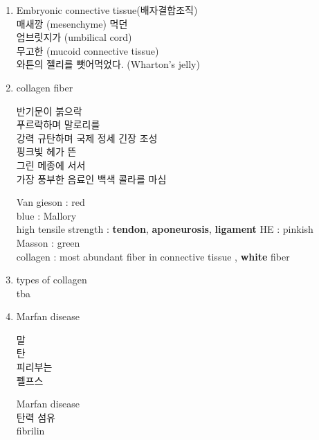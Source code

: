 \documentclass[10pt]{amsart}
\numberwithin{theorem}{section}
\numberwithin{example}{section}
\theoremstyle{definition}
\theoremstyle{remark}
\begin{document}
\begin{enumerate}
\item Embryonic connective tissue(배자결합조직) \\
매새깡 (mesenchyme) 먹던  \\
엄브릿지가 (umbilical cord) \\
무고한 (mucoid connective tissue)  \\ 
와튼의 젤리를 뺏어먹었다.  (Wharton's jelly) \\ 
    
    
    \item collagen fiber
    
    \begin{minipage}{0.4\textwidth}
    반기문이 붉으락  \\
푸르락하며 말로리를 \\
강력 규탄하며  국제 정세 긴장 조성 \\ 
핑크빛 헤가 뜬  \\
그린 메종에 서서  \\
가장 풍부한 음료인 백색 콜라를 마심 \\
    \end{minipage}
    \hfill
    \vrule
    \hfill 
    \begin{minipage}{0.4\textwidth}
    Van gieson : red \\
    blue : Mallory \\
    high tensile strength : \textbf{tendon}, \textbf{aponeurosis}, \textbf{ligament}
    HE : pinkish \\
    Masson : green \\
    collagen : most abundant fiber in connective tissue , \textbf{white} fiber
    \end{minipage}
    
    \item types of collagen \\
    tba
    
    \item Marfan disease \\
    \begin{minipage}{0.4\textwidth}
    말 \\
    탄 \\
    피리부는 \\
    펠프스 
    \end{minipage}
    \hfill\vrule\hfill
    \begin{minipage}{0.4\textwidth}
    Marfan disease \\
    탄력 섬유 \\
    fibrilin 
    \end{minipage}
    

\end{enumerate}
\end{document}
